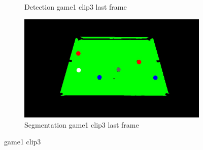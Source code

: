 \begin{figure}[H]
\begin{subfigure}[b]{0.35\textwidth}
        \caption{Detection game1 clip3 last frame}
        \label{fig: game1_clip3_last_frame_detected}
    \end{subfigure}
    \begin{subfigure}[b]{0.35\textwidth}
        \centering
        \includegraphics[width=\textwidth]{images/Segmentation/game1_clip3_segmented_balls_last_frame.jpg}
        \caption{Segmentation game1 clip3 last frame}
		\label{fig: game1_clip3_last_frame_segmented}
    \end{subfigure}
    
	\caption{game1 clip3}
\end{figure}


